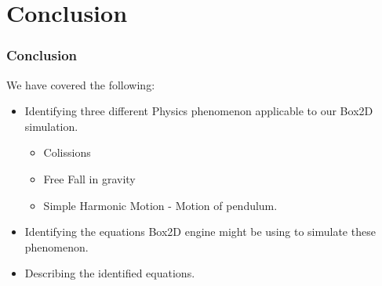 \section{Conclusion}
\begin{frame}
	\frametitle{Conclusion}
	We have covered the following:\pause
	
	\begin{itemize}
		\item Identifying three different Physics phenomenon applicable to our Box2D simulation.\pause
			\begin{itemize}
				\item Colissions\pause
				\item Free Fall in gravity\pause
				\item Simple Harmonic Motion - Motion of pendulum.\pause
			\end{itemize}
		\item Identifying the equations Box2D engine might be using to simulate these phenomenon.\pause
		\item Describing the identified equations.\pause
	\end{itemize}
\end{frame}

